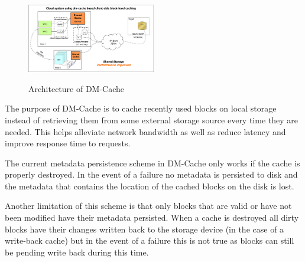 \graphicspath{{../Images/}}

\begin{figure}[t]
  \caption{Architecture of DM-Cache}
  \centering \includegraphics[width=0.5\textwidth]{NewerImage.png}
  \label{fig:dm-cache}
\end{figure}

The purpose of DM-Cache is to cache recently used blocks on local
storage instead of retrieving them from some external storage source
every time they are needed. This helps alleviate network bandwidth as
well as reduce latency and improve response time to requests.

The current metadata persistence scheme in DM-Cache only works if the
cache is properly destroyed. In the event of a failure no metadata is
persisted to disk and the metadata that contains the location of the
cached blocks on the disk is lost.

Another limitation of this scheme is that only blocks that are valid
or have not been modified have their metadata persisted. When a cache
is destroyed all dirty blocks have their changes written back to the
storage device (in the case of a write-back cache) but in the event of
a failure this is not true as blocks can still be pending write back
during this time.
